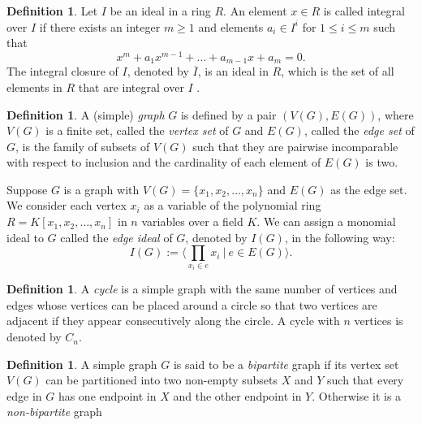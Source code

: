 \documentclass[11pt,reqno,a4paper]{amsart}
\theoremstyle{definition}
\newtheorem{definition}[theorem]{Definition}
\begin{document}
\begin{definition}
    

Let \(I\) be an ideal in a ring \(R\). An element \(x \in R\) is called integral over \(I\) if there exists an integer \(m \geq 1\) and elements \(a_i \in I^i\) for \(1 \leq i \leq m\) such that
\[
x^{m} + a_{1}x^{m - 1} + \dots +a_{m - 1}x + a_{m} = 0.
\]
The integral closure of \(I\), denoted by \(\overline{I}\), is an ideal in \(R\), which is the set of all elements in \(R\) that are integral over \(I\) .



\end{definition}





\begin{definition}
    A (simple) \textit{graph} ${G}$ is defined by a pair $(V({G}), E({G}))$, where $V({G})$ is a finite set, called the \textit{vertex set} of $G$ and  $E({G})$, called the \textit{edge set} of $G$, is the family of subsets of $V(G)$ such that they are pairwise incomparable with respect to inclusion and the cardinality of each element of $E({G})$ is two. 
\end{definition}

Suppose ${G}$ is a graph with $V({G})=\{x_1,x_2,\ldots,x_n\}$ and $E({G})$ as the edge set. We consider each vertex $x_i$ as a variable of the polynomial ring $R=K[x_1,x_2,\ldots,x_n]$ in $n$ variables over a field $K$. We can assign a monomial ideal to $G$ called the \textit{edge ideal} of $G$, denoted by $I(G)$, in the following way:
    $$I({G}):=\langle\prod_{x_i\in e}x_i~|~e\in E({G})\rangle.$$





\begin{definition}
    A \textit{cycle} is a simple graph with the same number of vertices and edges whose vertices can be placed around a circle so that two vertices are adjacent if they appear consecutively along the circle. A cycle with $n$ vertices is denoted by $C_n$.
\end{definition}
\begin{definition}
    A simple graph $G$ is said to be a \textit{bipartite} graph if its vertex set $V(G)$ can be partitioned into two non-empty subsets $X$ and $Y$ such that every edge in $G$ has one endpoint in $X$ and the other endpoint in $Y$. Otherwise it is a \textit{non-bipartite} graph
\end{definition}
\end{document}

